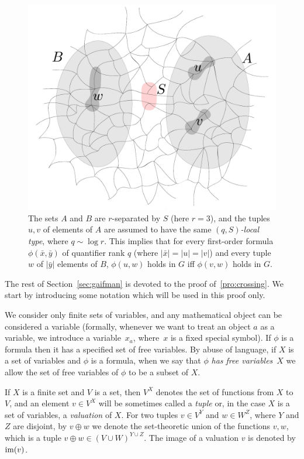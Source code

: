 \begin{figure}[h!]
	\centering
		\includegraphics[scale=0.3,page=1]{pics}
	\caption{The sets $A$ and $B$ are $r$-separated by $S$
	(here $r=3$), and the tuples $u,v$ of elements of $A$ are assumed to have  
	the same \emph{$(q,S)$-local type}, where $q\sim \log r$. This implies that 
	for every first-order formula $\phi(\bar x,\bar y)$ of quantifier rank
	$q$
	(where $|\bar x|=|u|=|v|$)
	and every tuple $w$ of $|\bar y|$ elements of $B$,	
	  $\phi(u,w)$ holds in $G$ iff 
	 $\phi(v,w)$ holds in $G$.
	}
	\label{fig:gaifman}
\end{figure}

The rest of Section~\ref{sec:gaifman} is devoted to the proof of~\cref{pro:crossing}.
We start by introducing some notation which will be used in this proof only.

We consider only finite sets of variables, and any mathematical object can be considered a variable 
(formally, whenever we want to treat an object $a$ as a variable, we introduce a variable~$x_a$, where~$x$ is a fixed special symbol).
If $\phi$ is a formula then it has a specified set of free variables.
By abuse of language, if $X$ is a set of variables and $\phi$
is a formula, when we say that $\phi$ \emph{has free variables}~$X$
we allow the set of free variables of $\phi$ to be a subset of $X$.

If $X$ is a finite set and $V$ is a set, then $V^X$ denotes the set of functions from $X$ to $V$, and an element $v\in V^X$ will be sometimes called a \emph{tuple} 
or, in the case $X$ is a set of variables, a \emph{valuation} of $X$.
For two tuples
$v\in V^Y$ and $w\in  W^Z$, where $Y$ and $Z$ are disjoint, by
$v\oplus w$ we denote the set-theoretic union of the functions $v,w$,
which is a tuple $v\oplus w\in (V\cup W)^{Y\cup Z}$.
The image of a valuation $v$ is denoted by $\mathrm{im}(v)$.


